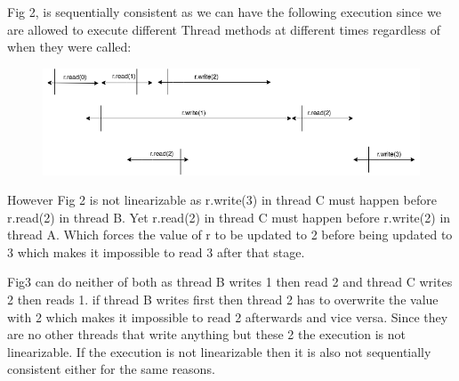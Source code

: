\documentclass[11pt,letterpaper]{exam}
\begin{document}
\begin{questions}
		\newpage
		\question
			Fig 2, is sequentially consistent as we can have the following execution since we are allowed to execute different Thread methods at different times regardless of when they were called:
			\begin{figure}[h!]
				\centering
				\includegraphics[scale=0.4]{Fig2Sequential}
			\end{figure}
			
			However Fig 2 is not linearizable as r.write(3) in thread C must happen before r.read(2) in thread B. Yet r.read(2) in thread C must happen before r.write(2) in thread A. Which forces the value of r to be updated to 2 before being updated to 3 which makes it impossible to read 3 after that stage.
			
			Fig3 can do neither of both as thread B writes 1 then read 2 and thread C writes 2 then reads 1. if thread B writes first then thread 2 has to overwrite the value with 2 which makes it impossible to read 2 afterwards and vice versa. Since they are no other threads that write anything but these 2 the execution is not linearizable. If the execution is not linearizable then it is also not sequentially consistent either for the same reasons.
		
		\question
	\end{questions}
\end{document}
